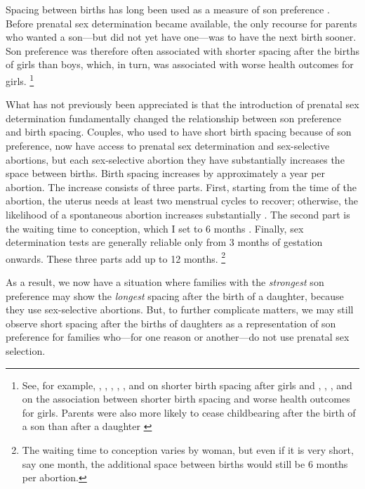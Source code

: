 \documentclass[12pt,letterpaper]{article}
\begin{document}
Spacing between births has long been used as a measure of son preference 
\citep{Leung1988}.
Before prenatal sex determination became available, the only recourse for 
parents who wanted a son---but did not yet have one---was to have the next 
birth sooner.
Son preference was therefore often associated with shorter spacing after the 
births of girls than boys, which, in turn, was associated with worse 
health outcomes for girls.%
\footnote{
See, for example, 
\citet{Das1987}, \citet{Rahman1993}, \citet{Pong1994}, \citet{Haughton1996},
\citet{Arnold1997}, and \citet{Soest2012} on shorter birth spacing after
girls
and 
\citet{arnold98}, \citet{Whitworth2002}, \citet{Rutstein2005},
and \citet{Conde-Agudelo2006} on the association between shorter birth
spacing and worse health outcomes for girls.
Parents were also more likely to cease childbearing after the birth of 
a son than after a daughter 
\citep{ben-porath76b,Das1987,Arnold1997,clark00,filmer09,Altindag2016}
}

What has not previously been appreciated is that the introduction 
of prenatal sex determination fundamentally changed the relationship 
between son preference and birth spacing.
Couples, who used to have short birth spacing because of son preference,
now have access to prenatal sex determination and sex-selective abortions,
but each sex-selective abortion they have substantially increases the space
between births. 
Birth spacing increases by approximately a year per abortion.
The increase consists of three parts.
First, starting from the time of the abortion, the uterus needs at 
least two menstrual cycles to recover;  otherwise, the likelihood 
of a spontaneous abortion increases substantially \citep{zhou00b}.
The second part is the waiting time to conception, which I set to 6 
months \citep{Wang2003}.
Finally, sex determination tests are generally reliable only from 3 months 
of gestation onwards.
These three parts add up to 12 months.%
\footnote{
The waiting time to conception varies by woman, but even if it is very 
short, say one  month, the additional space between births would still
be 6 months per abortion.
}

As a result, we now have a situation where families with the \emph{strongest} son 
preference may show the \emph{longest} spacing after the birth of a daughter,
because they use sex-selective abortions.
But, to further complicate matters, we may still observe short spacing 
after the births of daughters as a representation of son preference for 
families who---for one reason or another---do not use prenatal sex selection.
\end{document}
